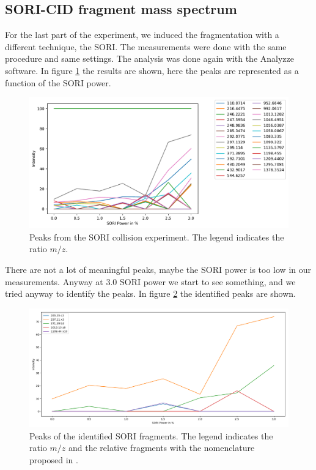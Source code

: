 \documentclass[a4paper,10pt]{article}
\begin{document}
\subsection{SORI-CID fragment mass spectrum}
For the last part of the experiment, we induced the fragmentation with a different technique, the SORI. The measurements were done with the same procedure and same settings. The analysis was done again with the Analyzze software. In figure \ref{soricollision} the results are shown, here the peaks are represented as a function of the SORI power.


\begin{figure}[H]
	\includegraphics[width = \textwidth]{sori_cid.pdf}
	\caption{Peaks from the SORI collision experiment. The legend indicates the ratio $m/z$.}
	\label{soricollision}
\end{figure}
There are not a lot of meaningful peaks, maybe the SORI power is too low in our measurements. Anyway at 3.0 SORI power we start to see something, and we tried anyway to identify the peaks. In figure \ref{soriidentified} the identified peaks are shown. 

\begin{figure}[H]
	\centering
	\includegraphics[width = \textwidth]{identifiedsori.png}
	\caption{Peaks of the identified SORI fragments. The legend indicates the ratio $m/z$ and the relative fragments with the nomenclature proposed in \cite{fragmentsnomenclature}.}
	\label{soriidentified}
\end{figure}
\end{document}
